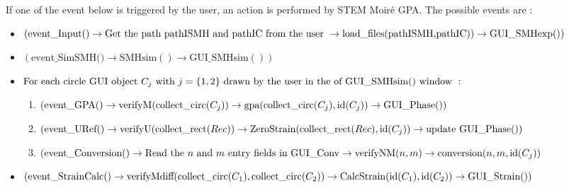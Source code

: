 \documentclass[12pt, titlepage]{article}
\newcommand{\progname}{STEM Moir{\'e} GPA}
\begin{document}
\begin{itemize}
If one of the event below is triggered by the user, an action is performed by 
\progname{}. The possible events are :
	\begin{itemize}
	\item $(\text{event{\_}Input()} \\ \rightarrow \text{Get the path pathISMH and 
pathIC from the user} \  \rightarrow \\ 
\text{load{\_}files(pathISMH,pathIC)})\rightarrow \text{GUI{\_}SMHexp}())$
	\item $(\text{event{\_}SimSMH()} \rightarrow \text{SMHsim}() \rightarrow 
\text{GUI{\_}SMHsim}())$
	\item $\text{For each circle GUI object } C_j \text{ with } j=\{1,2\} \\ \text{ 
drawn by the user in the of GUI{\_}SMHsim() window }: $
		\begin{enumerate}
		\item $(\text{event{\_}GPA()} \rightarrow 
\text{verifyM}(\text{collect{\_}circ}(C_j)) \rightarrow \\ 
\text{gpa}(\text{collect{\_}circ}(C_j),\text{id}(C_j)) \rightarrow 
\text{GUI{\_}Phase}())$
		\item $(\text{event{\_}URef()} \rightarrow 
\text{verifyU}(\text{collect{\_}rect}(Rec))\rightarrow \\ \text{ZeroStrain}( 
\text{collect{\_}rect}(Rec),\text{id}(C_j))\rightarrow \text{update 
GUI{\_}Phase}())$
		\item $(\text{event{\_}Conversion()} \rightarrow \text{Read the $n$ and $m$ 
entry fields in GUI{\_}Conv} \rightarrow \\ \text{verifyNM}(n,m)\rightarrow 
\text{conversion}(n,m,\text{id}(C_j))$
		\end{enumerate}
	\item $(\text{event{\_}StrainCalc()} \rightarrow 
\text{verifyMdiff}(\text{collect{\_}circ}(C_1),\text{collect{\_}circ}(C_2)) 
\rightarrow \\
	 \text{CalcStrain}(\text{id}(C_1),\text{id}(C_2))\rightarrow 
\text{GUI{\_}Strain}())$
	\end{itemize}
\end{itemize}

\end{document}
